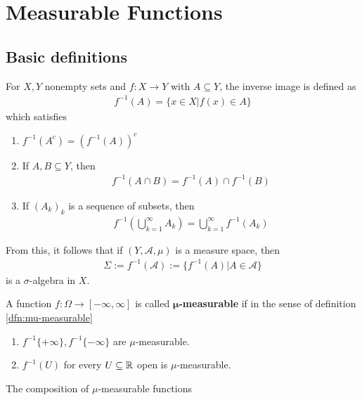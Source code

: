 \section{Measurable Functions}

\subsection{Basic definitions}
For $X,Y$ nonempty sets and $f: X \to  Y$ with $A \subseteq Y$, the inverse image is defined as
\begin{align*}
  f^{-1}(A) = \{x \in X \big\vert f(x)\in A\}
\end{align*}
which satisfies
\begin{enumerate}
  \item $f^{-1}(A^{c}) = \left(f^{-1}(A)\right)^{c}$
  \item If $A,B \subseteq Y$, then
    \begin{align*}
      f^{-1}(A \cap B) = f^{-1}(A) \cap f^{-1}(B) 
    \end{align*}
  \item If $(A_k)_{k}$ is a sequence of subsets, then
    \begin{align*}
      f^{-1} \left(
        \bigcup_{k = 1}^{\infty}A_k
      \right)
      = \bigcup_{k=1}^{\infty}f^{-1}(A_k)
    \end{align*}
\end{enumerate}
From this, it follows that if $(Y,\mathcal{A},\mu)$ is a measure space, then 
\begin{align*}
  \Sigma := f^{-1}(\mathcal{A}) := \{f^{-1}(A) \big\vert A \in \mathcal{A}\}
\end{align*}
is a $\sigma$-algebra in $X$.


\begin{dfn}[]
  A function $f: \Omega \to [-\infty,\infty]$ is called \textbf{$\bm{\mu}$-measurable} if in the sense of definition \ref{dfn:mu-measurable}
  \begin{enumerate}
    \item $f^{-1} \{+ \infty\}, f^{-1}\{-\infty\}$ are $\mu$-measurable.
    \item$f^{-1}(U)$ for every $U \subseteq \mathbb{R}$ open is $\mu$-measurable.
  \end{enumerate}
\end{dfn}
The composition of $\mu$-measurable functions
